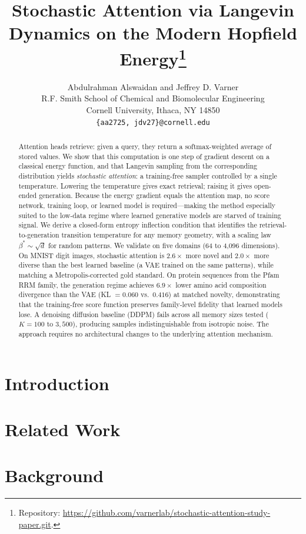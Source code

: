 \documentclass{article}
\title{Stochastic Attention via Langevin Dynamics on the Modern Hopfield Energy\thanks{Repository: \url{https://github.com/varnerlab/stochastic-attention-study-paper.git}.}}
\author{%
  Abdulrahman Alswaidan and Jeffrey D. Varner \\
  R.F. Smith School of Chemical and Biomolecular Engineering\\
  Cornell University, Ithaca, NY 14850 \\
  \texttt{\{aa2725, jdv27\}@cornell.edu} \\
}
\theoremstyle{definition}
\theoremstyle{remark}
\begin{document}
\maketitle

\begin{abstract}
Attention heads retrieve: given a query, they return a softmax-weighted average of stored values. We show that this computation is one step of gradient descent on a classical energy function, and that Langevin sampling from the corresponding distribution yields \emph{stochastic attention}: a training-free sampler controlled by a single temperature. Lowering the temperature gives exact retrieval; raising it gives open-ended generation. Because the energy gradient equals the attention map, no score network, training loop, or learned model is required---making the method especially suited to the low-data regime where learned generative models are starved of training signal. We derive a closed-form entropy inflection condition that identifies the retrieval-to-generation transition temperature for any memory geometry, with a scaling law $\beta^*\!\sim\!\sqrt{d}$ for random patterns. We validate on five domains (64 to 4,096 dimensions). On MNIST digit images, stochastic attention is $2.6{\times}$ more novel and $2.0{\times}$ more diverse than the best learned baseline (a VAE trained on the same patterns), while matching a Metropolis-corrected gold standard. On protein sequences from the Pfam RRM family, the generation regime achieves $6.9{\times}$ lower amino acid composition divergence than the VAE (KL $= 0.060$ vs.\ $0.416$) at matched novelty, demonstrating that the training-free score function preserves family-level fidelity that learned models lose. A denoising diffusion baseline (DDPM) fails across all memory sizes tested ($K = 100$ to $3{,}500$), producing samples indistinguishable from isotropic noise. The approach requires no architectural changes to the underlying attention mechanism.
\end{abstract}


\section{Introduction}


\section{Related Work}


\section{Background}

\end{document}
